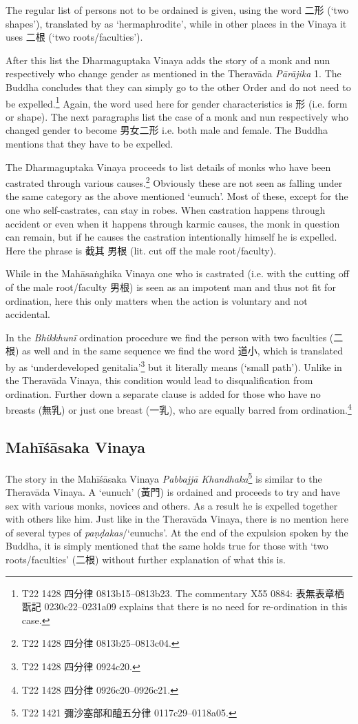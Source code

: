 The regular list of persons not to be ordained is given, using the word 二形 (`two shapes'), translated by \cite{bodhi} as `hermaphrodite', while in other places in the Vinaya it uses 二根 (`two roots/faculties'). 

After this list the Dharmaguptaka Vinaya adds the story of a monk and nun respectively who change gender as mentioned in the Theravāda {\em Pārājika} 1. The Buddha concludes that they can simply go to the other Order and do not need to be expelled.\footnote{T22 1428 四分律 0813b15–0813b23. The commentary X55 0884: 表無表章栖翫記 0230c22–0231a09 explains that there is no need for re-ordination in this case.} Again, the word used here for gender characteristics is 形 (i.e. form or shape). The next paragraphs list the case of a monk and nun respectively who changed gender to become 男女二形 i.e. both male and female. The Buddha mentions that they have to be expelled.

The Dharmaguptaka Vinaya proceeds to list details of monks who have been castrated through various causes.\footnote{T22 1428 四分律 0813b25–0813c04.} Obviously these are not seen as falling under the same category as the above mentioned `eunuch'. Most of these, except for the one who self-castrates, can stay in robes. When castration happens through accident or even when it happens through karmic causes, the monk in question can remain, but if he causes the castration intentionally himself he is expelled. Here the phrase is 截其 男根 (lit. cut off the male root/faculty).

While in the Mahāsaṅghika Vinaya one who is castrated (i.e. with the cutting off of the male root/faculty 男根) is seen as an impotent man and thus not fit for ordination, here this only matters when the action is voluntary and not accidental.

In the {\em Bhikkhunī} ordination procedure we find the person with two faculties (二根) as well and in the same sequence we find the word 道小, which is translated by \cite{bodhi} as `underdeveloped genitalia'\footnote{T22 1428 四分律 0924c20.} but it literally means (`small path'). Unlike in the Theravāda Vinaya, this condition would lead to disqualification from ordination. Further down a separate clause is added for those who have no breasts (無乳) or just one breast (一乳), who are equally barred from ordination.\footnote{T22 1428 四分律 0926c20–0926c21.}


\subsection{Mahīśāsaka Vinaya}
The story in the Mahīśāsaka Vinaya {\em Pabbajjā Khandhaka}\footnote{T22 1421 彌沙塞部和醯五分律 0117c29–0118a05.} is similar to the Theravāda Vinaya. A `eunuch' (黃門) is ordained and proceeds to try and have sex with various monks, novices and others. As a result he is expelled together with others like him. Just like in the Theravāda Vinaya, there is no mention here of several types of {\em paṇḍakas}/`eunuchs'. At the end of the expulsion spoken by the Buddha, it is simply mentioned that the same holds true for those with `two roots/faculties' (二根) without further explanation of what this is.

